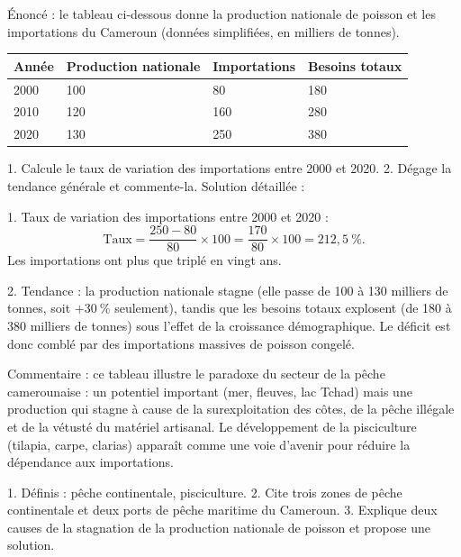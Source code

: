 \documentclass[11pt]{article}
\begin{document}
\begin{exoresolu}
Énoncé : le tableau ci-dessous donne la production nationale de poisson et les importations du Cameroun (données simplifiées, en milliers de tonnes).

\begin{center}
\begin{tabularx}{\linewidth}{|l|X|X|X|}\hline
\rowcolor{popblueL} \textbf{Année} & \textbf{Production nationale} & \textbf{Importations} & \textbf{Besoins totaux} \\ \hline
2000 & 100 & 80 & 180 \\ \hline
2010 & 120 & 160 & 280 \\ \hline
2020 & 130 & 250 & 380 \\ \hline
\end{tabularx}
\end{center}

1. Calcule le taux de variation des importations entre 2000 et 2020. 2. Dégage la tendance générale et commente-la.
\tcblower
Solution détaillée :

1. Taux de variation des importations entre 2000 et 2020 :
\[ \text{Taux} = \frac{250 - 80}{80} \times 100 = \frac{170}{80} \times 100 = 212{,}5\ \%. \]
Les importations ont plus que triplé en vingt ans.

2. Tendance : la production nationale stagne (elle passe de 100 à 130 milliers de tonnes, soit $+30\ \%$ seulement), tandis que les besoins totaux explosent (de 180 à 380 milliers de tonnes) sous l'effet de la croissance démographique. Le déficit est donc comblé par des importations massives de poisson congelé.

Commentaire : ce tableau illustre le paradoxe du secteur de la pêche camerounaise : un potentiel important (mer, fleuves, lac Tchad) mais une production qui stagne à cause de la surexploitation des côtes, de la pêche illégale et de la vétusté du matériel artisanal. Le développement de la pisciculture (tilapia, carpe, clarias) apparaît comme une voie d'avenir pour réduire la dépendance aux importations.
\end{exoresolu}

\begin{exercice}
1. Définis : pêche continentale, pisciculture. 2. Cite trois zones de pêche continentale et deux ports de pêche maritime du Cameroun. 3. Explique deux causes de la stagnation de la production nationale de poisson et propose une solution.
\end{exercice}
\end{document}
